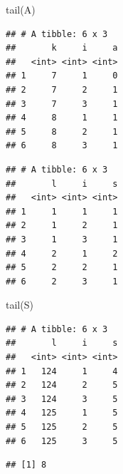 \documentclass[
]{book}
\newenvironment{Shaded}{\begin{snugshade}}{\end{snugshade}}
\newcommand{\CommentTok}[1]{\textcolor[rgb]{0.56,0.35,0.01}{\textit{#1}}}
\newcommand{\FunctionTok}[1]{\textcolor[rgb]{0.00,0.00,0.00}{#1}}
\newcommand{\NormalTok}[1]{#1}
\newcommand{\OtherTok}[1]{\textcolor[rgb]{0.56,0.35,0.01}{#1}}
\newcommand{\SpecialCharTok}[1]{\textcolor[rgb]{0.00,0.00,0.00}{#1}}
\begin{document}
\begin{Shaded}
\begin{Highlighting}[]
\FunctionTok{tail}\NormalTok{(A)}
\end{Highlighting}
\end{Shaded}

\begin{verbatim}
## # A tibble: 6 x 3
##       k     i     a
##   <int> <int> <int>
## 1     7     1     0
## 2     7     2     1
## 3     7     3     1
## 4     8     1     1
## 5     8     2     1
## 6     8     3     1
\end{verbatim}

\begin{Shaded}
\end{Shaded}

\begin{verbatim}
## # A tibble: 6 x 3
##       l     i     s
##   <int> <int> <int>
## 1     1     1     1
## 2     1     2     1
## 3     1     3     1
## 4     2     1     2
## 5     2     2     1
## 6     2     3     1
\end{verbatim}

\begin{Shaded}
\begin{Highlighting}[]
\FunctionTok{tail}\NormalTok{(S)}
\end{Highlighting}
\end{Shaded}

\begin{verbatim}
## # A tibble: 6 x 3
##       l     i     s
##   <int> <int> <int>
## 1   124     1     4
## 2   124     2     5
## 3   124     3     5
## 4   125     1     5
## 5   125     2     5
## 6   125     3     5
\end{verbatim}

\begin{Shaded}
\end{Shaded}

\begin{verbatim}
## [1] 8
\end{verbatim}
\end{document}

